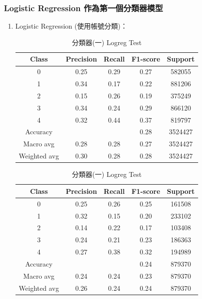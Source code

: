     \subsubsection{Logistic Regression 作為第一個分類器模型}
    \begin{enumerate}
        \item Logistic Regression (使用帳號分類)：

        \begin{table}[H]
        \centering
        \scriptsize
        \begin{minipage}{0.48\textwidth}
        \centering
        \begin{tabular}{c|cccc}
        \hline
        Class & Precision & Recall & F1-score & Support \\
        \hline
        0 & 0.25 & 0.29 & 0.27 & 582055 \\
        1 & 0.34 & 0.17 & 0.22 & 881206 \\
        2 & 0.15 & 0.26 & 0.19 & 375249 \\
        3 & 0.34 & 0.24 & 0.29 & 866120 \\
        4 & 0.32 & 0.44 & 0.37 & 819797 \\
        \hline
        Accuracy &       &      & 0.28 & 3524427 \\
        Macro avg & 0.28 & 0.28 & 0.27 & 3524427 \\
        Weighted avg & 0.30 & 0.28 & 0.28 & 3524427 \\
        \hline
        \end{tabular}
        \caption{分類器(一) Logreg Train}
        \label{tab:classifier_1_report_train_logreg_filtered}
        \end{minipage}%
        \hfill
        \begin{minipage}{0.48\textwidth}
        \centering
        \begin{tabular}{c|cccc}
        \hline
        Class & Precision & Recall & F1-score & Support \\
        \hline
        0 & 0.25 & 0.26 & 0.25 & 161508 \\
        1 & 0.32 & 0.15 & 0.20 & 233102 \\
        2 & 0.14 & 0.22 & 0.17 & 103408 \\
        3 & 0.24 & 0.21 & 0.23 & 186363 \\
        4 & 0.27 & 0.38 & 0.32 & 194989 \\
        \hline
        Accuracy &       &      & 0.24 & 879370 \\
        Macro avg & 0.24 & 0.24 & 0.23 & 879370 \\
        Weighted avg & 0.26 & 0.24 & 0.24 & 879370 \\
        \hline
        \end{tabular}
        \caption{分類器(一) Logreg Test}
        \label{tab:classifier_1_report_test_logreg_filtered}
        \end{minipage}
        \end{table}



\end{enumerate}
